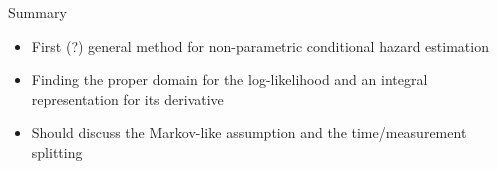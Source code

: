 \documentclass{beamer}\usepackage{listings}
\begin{document}
\begin{frame}[label={sec:org7e19044}]{Summary}
\begin{itemize}
\item First (?) general method for non-parametric conditional hazard estimation
\item Finding the proper domain for the log-likelihood and an integral representation for its derivative
\item Should discuss the Markov-like assumption and the time/measurement splitting
\end{itemize}
\end{frame}
\end{document}
